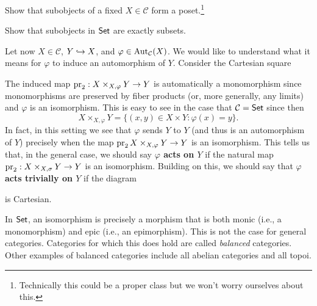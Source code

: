 \documentclass[11pt]{article}
\newcommand{\CC}{\mathcal{C}}
\renewcommand{\phi}{\varphi}
\begin{document}
\begin{exercise}
Show that subobjects of a fixed $X\in\CC$ form a poset.\footnote{Technically this could be a proper class but we won't worry ourselves about this.}
\end{exercise}

\begin{exercise}
Show that subobjects in $\operatorname{\mathsf{Set}}$ are exactly subsets.
\end{exercise}

Let now $X\in\CC$, $Y\hookrightarrow X$, and $\phi\in\Aut_{\CC}(X)$. We would like to understand what it means for $\phi$ to induce an automorphism of $Y$. Consider the Cartesian square
\begin{center}
\end{center}
The induced map $\pr_2: X\times_{X,\phi}Y\to Y$ is automatically a monomorphism since monomorphisms are preserved by fiber products (or, more generally, any limits) and $\phi$ is an isomorphism. This is easy to see in the case that $\CC=\Set$ since then 
$$X\times_{X,\phi}Y=\{(x,y)\in X\times Y : \phi(x)=y\}.$$
In fact, in this setting we see that $\phi$ sends $Y$ to $Y$ (and thus is an automorphism of $Y$) precisely when the map $\pr_2 X\times_{X,\phi}Y\to Y$ is an isomorphism. This tells us that, in the general case, we should say \textbf{$\phi$ acts on $Y$} if the natural map $\operatorname{pr}_2: X\times_{X,\sigma}Y\to Y$ is an isomorphism. Building on this, we should say that \textbf{$\phi$ acts trivially on $Y$} if the diagram
\begin{center}
\end{center}
is Cartesian.

\begin{remark}
In $\operatorname{\mathsf{Set}}$, an isomorphism is precisely a morphism that is both monic (i.e., a monomorphism) and epic (i.e., an epimorphism). This is not the case for general categories. Categories for which this does hold are called \emph{balanced} categories. Other examples of balanced categories include all abelian categories and all topoi.
\end{remark}
\end{document}
